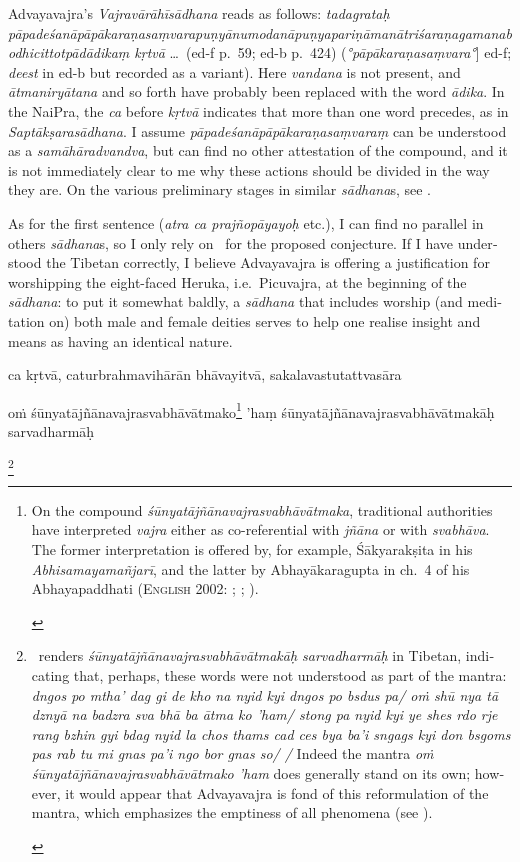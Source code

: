 \documentclass[naipra.tex]{subfiles}
\begin{document}
\begin{sanskrit}
{\begin{english}
		Advayavajra's \emph{Vajravārāhīsādhana} reads as follows: \emph{tadagrataḥ pāpadeśanāpāpākaraṇasaṃvarapuṇyānumodanāpuṇyapariṇāmanātriśaraṇagamanabodhicittotpādādikaṃ kṛtvā} \ldots\ (ed-f p.\ 59; ed-b p.\ 424) (\emph{°pāpākaraṇasaṃvara°}] ed-f; \emph{deest} in ed-b but recorded as a variant).
		Here \emph{vandana} is not present, and \emph{ātmaniryātana} and so forth have probably been replaced with the word \emph{ādika}.
		In the NaiPra, the \emph{ca} before \emph{kṛtvā} indicates that more than one word precedes, as in \emph{Saptākṣarasādhana}.
		I assume \emph{pāpadeśanāpāpākaraṇasaṃvaraṃ} can be understood as a \emph{samāhāradvandva}, but can find no other attestation of the compound, and it is not immediately clear to me why these actions should be divided in the way they are.
		On the various preliminary stages in similar \emph{sādhana}s, see \textcite[122–124]{english2002}.

		As for the first sentence (\emph{atra ca prajñopāyayoḥ} etc.), I can find no parallel in others \emph{sādhana}s, so I only rely on \TIB\ for the proposed conjecture. 
		If I have understood the Tibetan correctly, I believe Advayavajra is offering a justification for worshipping the eight-faced Heruka, i.e.\ Picuvajra, at the beginning of the \emph{sādhana}: to put it somewhat baldly, a \emph{sādhana} that includes worship (and meditation on) both male and female deities serves to help one realise insight and means as having an identical nature.
	\end{english}
}ca kṛtvā, caturbrahmavihārān bhāvayitvā, sakalavastutattvasāra \begin{mantra}oṁ śūnyatājñānavajrasvabhāvātmako\footnote{
	\begin{english}%
		On the compound \emph{śūnyatājñānavajrasvabhāvātmaka}, traditional authorities have interpreted \emph{vajra} either as co-referential with \emph{jñāna} or with \emph{svabhāva}.	
		The former interpretation is offered by, for example, Śākyarakṣita in his \emph{Abhisamayamañjarī}, and the latter by Abhayākaragupta in ch.\ 4 of his Abhayapaddhati (\textsc{English 2002:} \cite[239–40 n.\ 273, n.\ 277]{english2002}; \cite[292]{isaacson2007}; \cite[140, 234]{yang2014}).
	\end{english}
} 'haṃ śūnyatājñānavajrasvabhāvātmakāḥ sarvadharmāḥ\end{mantra}\footnote{
	\begin{english}%
		\TIB\ renders \emph{śūnyatājñānavajrasvabhāvātmakāḥ sarvadharmāḥ} in Tibetan, indicating that, perhaps, these words were not understood as part of the mantra: \emph{dngos po mtha' dag gi de kho na nyid kyi dngos po bsdus pa/ oṁ shū nya tā dznyā na badzra sva bhā ba ātma ko 'ham/ stong pa nyid kyi ye shes rdo rje rang bzhin gyi bdag nyid la chos thams cad ces bya ba'i sngags kyi don bsgoms pas rab tu mi gnas pa'i ngo bor gnas so/ /}
		Indeed the mantra \emph{oṁ śūnyatājñānavajrasvabhāvātmako 'ham} does generally stand on its own; however, it would appear that Advayavajra is fond of this reformulation of the mantra, which emphasizes the emptiness of all phenomena (see \cite[128]{english2002}).


\end{english}}
\end{sanskrit}
\end{document}
